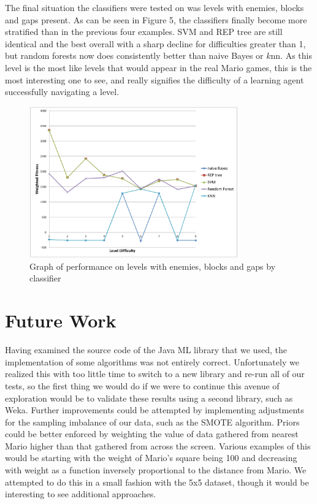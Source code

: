 \documentclass[]{article}   %
\begin{document}
The final situation the classifiers were tested on was levels with enemies, blocks and gaps present. As can be seen in Figure 5, the classifiers finally become 
more stratified than in the previous four examples. SVM and REP tree are still identical and the best overall with a sharp decline for difficulties greater than 1, but 
random forests now does consistently better than naive Bayes or $k$nn. As this level is the most like levels that would appear in the real Mario games, this is the most
interesting one to see, and really signifies the difficulty of a learning agent successfully navigating a level.
\begin{figure}[H]
\centering
\includegraphics[width=90mm]{enemiesblocksgaps.png}
\caption{Graph of performance on levels with enemies, blocks and gaps by classifier}
\end{figure}

\section{Future Work}

Having examined the source code of the Java ML library that we used, the implementation of some algorithms was not entirely correct. Unfortunately we realized this with too
little time to switch to a new library and re-run all of our tests, so the first thing we would do if we were to continue this avenue of exploration would be to validate
these results using a second library, such as Weka.
\newline\newline
Further improvements could be attempted by implementing adjustments for the sampling imbalance of our data, such as the SMOTE algorithm.
\newline\newline
Priors could be better enforced by weighting the value of data gathered from nearest Mario higher than that gathered from across the screen. Various examples of this would be
starting with the weight of Mario's square being 100 and decreasing with weight as a function inversely proportional to the distance from Mario. We attempted to do this in a
small fashion with the 5x5 dataset, though it would be interesting to see additional approaches.
\end{document}
